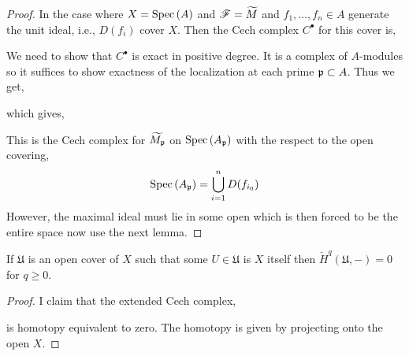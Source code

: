 \documentclass[12pt]{article}
\begin{document}
\begin{proof}
In the case where $X = \mathrm{Spec}\left( A \right)$ and $\mathscr{F} = \widetilde{M}$ and $f_1, \dots, f_n \in A$ generate the unit ideal, i.e., $D(f_i)$ cover $X$. Then the Cech complex $C^\bullet$ for this cover is,
\begin{center}
\end{center} 
We need to show that $C^\bullet$ is exact in positive degree. It is a complex of $A$-modules so it suffices to show exactness of the localization at each prime $\mathfrak{p} \subset A$. Thus we get,
\begin{center}
\end{center}
which gives,
\begin{center}
\end{center}
This is the Cech complex for $\widetilde{M_{\mathfrak{p}}}$ on $\mathrm{Spec}\left( A_{\mathfrak{p}} \right)$ with the respect to the open covering,
\[ \mathrm{Spec}\left( A_{\mathfrak{p}} \right) = \bigcup_{i = 1}^n D(f_{i_0}) \]
However, the maximal ideal must lie in some open which is then forced to be the entire space now use the next lemma.
\end{proof}

\begin{lemma}
If $\mathfrak{U}$ is an open cover of $X$ such that some $U \in \mathfrak{U}$ is $X$ itself then $\check{H}^q(\mathfrak{U}, -) = 0$ for $q \ge 0$.
\end{lemma}

\begin{proof}
I claim that the extended Cech complex,
\begin{center}
\end{center}
is homotopy equivalent to zero. The homotopy is given by projecting onto the open $X$. 
\end{proof}
\end{document}
